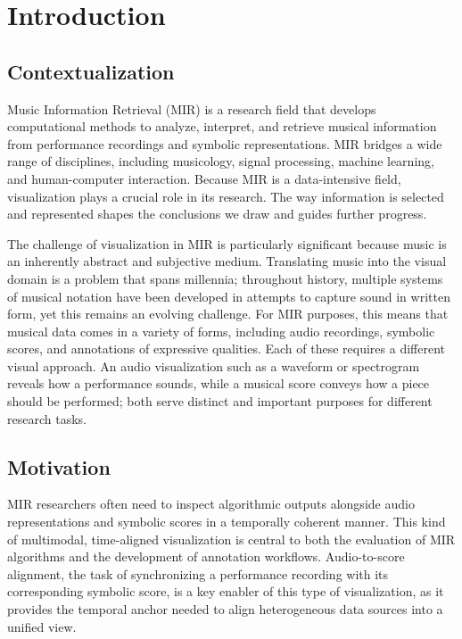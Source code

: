 \chapter{Introduction} \label{chap:intro}
\section{Contextualization}
Music Information Retrieval (MIR) is a research field that develops computational methods to analyze, interpret, and retrieve musical information from performance recordings and symbolic representations. MIR bridges a wide range of disciplines, including musicology, signal processing, machine learning, and human-computer interaction. Because MIR is a data-intensive field, visualization plays a crucial role in its research. The way information is selected and represented shapes the conclusions we draw and guides further progress.

The challenge of visualization in MIR is particularly significant because music is an inherently abstract and subjective medium. Translating music into the visual domain is a problem that spans millennia; throughout history, multiple systems of musical notation have been developed in attempts to capture sound in written form, yet this remains an evolving challenge. For MIR purposes, this means that musical data comes in a variety of forms, including audio recordings, symbolic scores, and annotations of expressive qualities. Each of these requires a different visual approach. An audio visualization such as a waveform or spectrogram reveals how a performance sounds, while a musical score conveys how a piece should be performed; both serve distinct and important purposes for different research tasks.

\pagebreak

\section{Motivation}
MIR researchers often need to inspect algorithmic outputs alongside audio representations and symbolic scores in a temporally coherent manner. This kind of multimodal, time-aligned visualization is central to both the evaluation of MIR algorithms and the development of annotation workflows. Audio-to-score alignment, the task of synchronizing a performance recording with its corresponding symbolic score, is a key enabler of this type of visualization, as it provides the temporal anchor needed to align heterogeneous data sources into a unified view.


